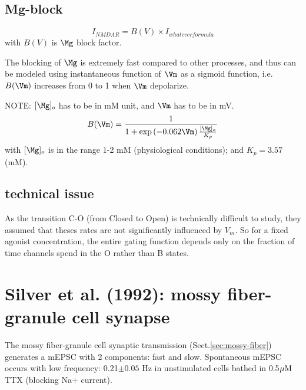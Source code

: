 \subsection{Mg-block}
\label{sec:NMDAR-Mg-block-Jahr-Stevens-1990}

\begin{equation}
I_{NMDAR} = B(V) \times I_{whatever formula}
\end{equation}
with $B(V)$ is $\Mg$ block factor.

The blocking of $\Mg$ is extremely fast compared to other processes, and thus
can be modeled using instantaneous function of $\Vm$ as a sigmoid function, i.e.
$B(\Vm)$ increases from 0 to 1 when $\Vm$ depolarize.

NOTE: $[\Mg]_o$ has to be in mM unit, and $\Vm$ has to be in mV.
\begin{equation}
B(\Vm) = \frac{1}{1 + \exp\left( -0.062 \Vm \right) \frac{[\Mg]_o}{K_p}}
\end{equation}
with $[\Mg]_o$ is in the range 1-2 mM (physiological conditions); and
$K_p=3.57$ (mM). 


\subsection{technical issue}

As the transition C-O (from Closed to Open) is technically difficult to study,
they assumed that theses rates are not significantly influenced by $V_m$. So
for a fixed agonist concentration, the entire gating function depends only on
the fraction of time channels spend in the O rather than B states.

\section{Silver et al. (1992): mossy fiber-granule cell synapse}
\label{sec:mEPSC-mossy-fiber-granule-cell}

The mossy fiber-granule cell synaptic transmission (Sect.\ref{sec:mossy-fiber})
generates a mEPSC with 2 components: fast and slow. Spontaneous mEPSC occurs
with low frequency: 0.21$\pm 0.05$ Hz in unstimulated cells bathed in 0.5${\mu\text{M}}$
TTX (blocking Na+ current).

